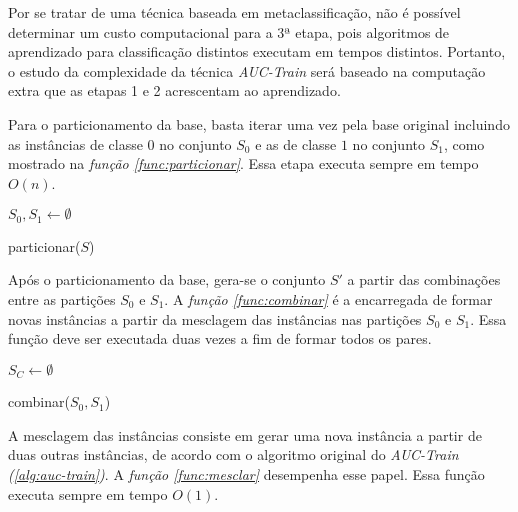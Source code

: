 Por se tratar de uma técnica baseada em metaclassificação, não é possível determinar um custo computacional para a 3ª etapa, pois algoritmos de aprendizado para classificação distintos executam em tempos distintos. Portanto, o estudo da complexidade da técnica \emph{AUC-Train} será baseado na computação extra que as etapas 1 e 2 acrescentam ao aprendizado.

Para o particionamento da base, basta iterar uma vez pela base original incluindo as instâncias de classe $0$ no conjunto $S_0$ e as de classe $1$ no conjunto $S_1$, como mostrado na \emph{função \ref{func:particionar}}. Essa etapa executa sempre em tempo $O(n)$.

\begin{function}[h!]
    
    $S_0, S_1 \gets \emptyset$\;
    
    

    \caption{particionar($S$)}
    \label{func:particionar}
\end{function}

Após o particionamento da base, gera-se o conjunto $S'$ a partir das combinações entre as partições $S_0$ e $S_1$. A \emph{função \ref{func:combinar}} é a encarregada de formar novas instâncias a partir da mesclagem das instâncias nas partições $S_0$ e $S_1$. Essa função deve ser executada duas vezes a fim de formar todos os pares.

\begin{function}[h!]

    $S_C \gets \emptyset$\;



    \caption{combinar($S_0, S_1$)}
    \label{func:combinar}
\end{function}

A mesclagem das instâncias consiste em gerar uma nova instância a partir de duas outras instâncias, de acordo com o algoritmo original do \emph{AUC-Train (\ref{alg:auc-train})}. A \emph{função \ref{func:mesclar}} desempenha esse papel. Essa função executa sempre em tempo $O(1)$.


